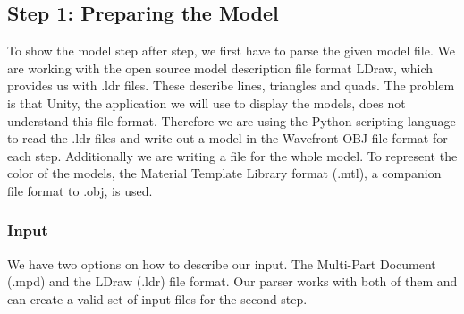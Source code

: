 \subsection{Step 1: Preparing the Model}

To show the model step after step, we first have to parse the given model file. We are working with the open source model description file format LDraw, which provides us with .ldr files. These describe lines, triangles and quads. The problem is that Unity, the application we will use to display the models, does not understand this file format. Therefore we are using the Python scripting language to read the .ldr files and write out a model in the Wavefront OBJ file format for each step. Additionally we are writing a file for the whole model. To represent the color of the models, the Material Template Library format (.mtl), a companion file format to .obj, is used.

\subsubsection{Input}
We have two options on how to describe our input. The Multi-Part Document (.mpd) and the LDraw (.ldr) file format. Our parser works with both of them and can create a valid set of input files for the second step.

